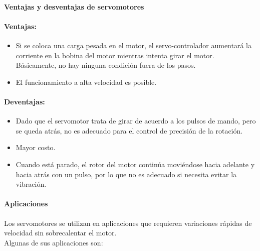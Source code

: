 \documentclass[12pt,titlepage]{article}
\begin{document}
\paragraph{Ventajas y desventajas de servomotores}\leavevmode\newline
\paragraph*{Ventajas:}\leavevmode\newline
\begin{itemize}
\item Si se coloca una carga pesada en el motor, el servo-controlador aumentará la corriente en la bobina del motor mientras intenta girar el motor. Básicamente, no hay ninguna condición fuera de los pasos. \\
\item El funcionamiento a alta velocidad es posible. \\ 
\end{itemize}
\paragraph*{Deventajas:}\leavevmode\newline
\begin{itemize}
\item Dado que el servomotor trata de girar de acuerdo a los pulsos de mando, pero se queda atrás, no es adecuado para el control de precisión de la rotación.
\item Mayor costo. 
\item Cuando está parado, el rotor del motor continúa moviéndose hacia adelante y hacia atrás con un pulso, por lo que no es adecuado si necesita evitar la vibración. 
\end{itemize}

\paragraph{Aplicaciones}\leavevmode\newline
Los servomotores se utilizan en aplicaciones que requieren variaciones rápidas de velocidad sin sobrecalentar el motor. \\

Algunas de sus aplicaciones son: \\
\end{document}
